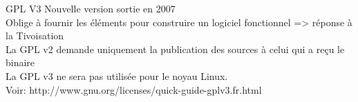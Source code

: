 \begin{frame}{GPL V3}{}
	Nouvelle version sortie en 2007\\
	Oblige à fournir les éléments pour construire un logiciel fonctionnel => réponse à la Tivoisation\\
	La GPL v2 demande uniquement la publication des sources à celui qui a reçu le binaire\\
	La GPL v3 ne sera pas utilisée pour le noyau Linux.\\
	Voir: http://www.gnu.org/licenses/quick-guide-gplv3.fr.html\\
\end{frame}
